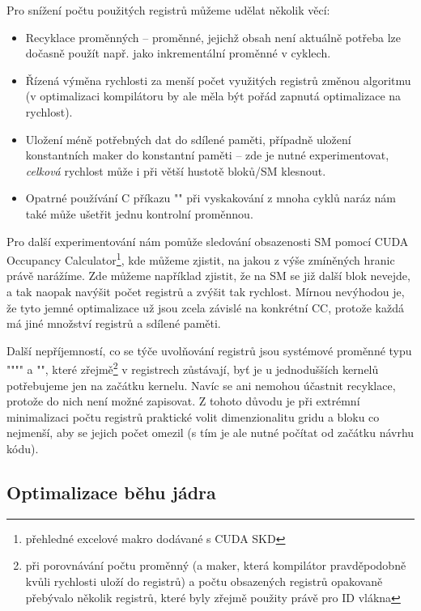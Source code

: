         Pro snížení počtu použitých registrů můžeme udělat několik věcí:
        \begin{itemize}
          \item Recyklace proměnných -- proměnné, jejichž obsah není aktuálně potřeba lze dočasně použít např. jako inkrementální proměnné v cyklech.
          \item Řízená výměna rychlosti za menší počet využitých registrů změnou algoritmu (v optimalizaci kompilátoru by ale měla být pořád zapnutá optimalizace na rychlost).
          \item Uložení méně potřebných dat do sdílené paměti, případně uložení konstantních maker do konstantní paměti -- zde je nutné experimentovat, \emph{celková} rychlost může i při větší hustotě bloků/SM klesnout.
          \item Opatrné používání C příkazu \Vr"" při vyskakování z mnoha cyklů naráz nám také může ušetřit jednu kontrolní proměnnou.
        \end{itemize}

        Pro další experimentování nám pomůže sledování obsazenosti SM pomocí CUDA Occupancy Calculator\footnote{přehledné excelové makro dodávané s CUDA SKD}, kde můžeme zjistit, na jakou z výše zmíněných hranic právě narážíme. Zde můžeme například zjistit, že na SM se již další blok nevejde, a tak naopak navýšit počet registrů a zvýšit tak rychlost. Mírnou nevýhodou je, že tyto jemné optimalizace už jsou zcela závislé na konkrétní CC, protože každá má jiné množství registrů a sdílené paměti.

        Další nepříjemností, co se týče uvolňování registrů jsou systémové proměnné typu \Vr""\linebreak\Vr"" a \Vr"", které zřejmě\footnote{při porovnávání počtu proměnný (a maker, která kompilátor pravděpodobně kvůli rychlosti uloží do registrů) a počtu obsazených registrů opakovaně přebývalo několik registrů, které byly zřejmě použity právě pro ID vlákna} v registrech zůstávají, byť je u jednodušších kernelů potřebujeme jen na začátku kernelu. Navíc se ani nemohou účastnit recyklace, protože do nich není možné zapisovat. Z tohoto důvodu je při extrémní minimalizaci počtu registrů praktické volit dimenzionalitu gridu a bloku co nejmenší, aby se jejich počet omezil (s tím je ale nutné počítat od začátku návrhu kódu).

    \subsection{Optimalizace běhu jádra}

